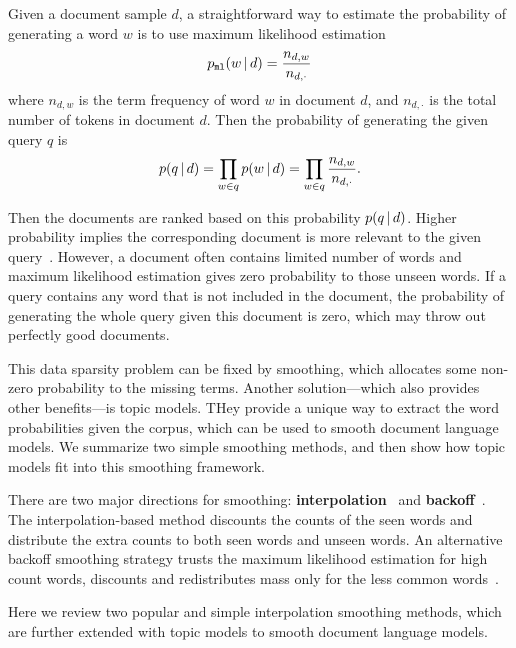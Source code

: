 Given a document sample $d$, a straightforward way to estimate the
probability of generating a word $w$ is to use maximum likelihood
estimation
\begin{align}
p_{\texttt{ml}}(w \, | \, d) = \frac{n_{d,w}}{n_{d,\cdot}}
\label{eq:ir_mse}
\end{align}
where $n_{d,w}$ is the term frequency of word $w$ in document $d$, and
$n_{d,\cdot}$ is the total number of tokens in document $d$. Then the
probability of generating the given query $q$ is
\begin{align}
p(q \, | \, d) = \prod_{w \in q} p(w \, | \, d) = \prod_{w \in q} \frac{n_{d,w}}{n_{d,\cdot}}.
\end{align}

Then the documents are ranked based on this probability $p(q \, | \, d)$. Higher
probability implies the corresponding document is more relevant to the
given query~\citep{song-99}. However, a document often contains limited number of words and
maximum likelihood estimation gives zero probability to those unseen words.
If a query contains any word that is not included in the document, the probability
of generating the whole query given this document is zero, which may throw out perfectly good documents.

This data sparsity problem can be fixed by smoothing, which allocates
some non-zero probability to the missing terms.  Another
solution---which also provides other benefits---is topic models.  THey
provide a unique way to extract the word probabilities given the
corpus, which can be used to smooth document language models.  We
summarize two simple smoothing methods, and then show how topic models
fit into this smoothing framework.


There are two major directions for smoothing:
\textbf{interpolation}~\citep{Jelinek-1980,mackay95dirichlet,Ney-1994,PonteCroft,zhai-01}
and \textbf{backoff}~\citep{katz-87,song-99}. The interpolation-based
method discounts the counts of the seen words and distribute the extra
counts to both seen words and unseen words. An alternative backoff
smoothing strategy trusts the maximum likelihood estimation for high
count words, discounts and redistributes mass only for the less common
words~\citep{zhai-01}.

Here we review two popular and simple interpolation smoothing
methods, which are further extended with topic models to smooth document
language models.

